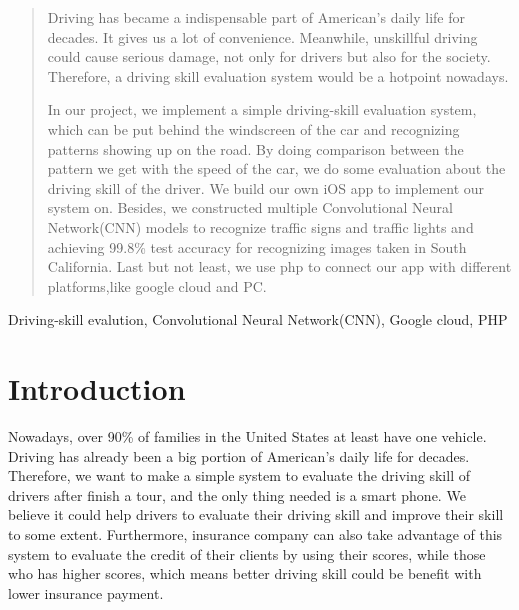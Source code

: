 \documentclass[conference]{IEEEtran}
\begin{document}
\begin{abstract}
Driving has became a indispensable part of American's daily life for decades. It gives us a lot of convenience. Meanwhile, unskillful driving could cause serious damage, not only for drivers but also for the society. Therefore, a driving skill evaluation system would be a hotpoint nowadays. 

In our project, we implement a simple driving-skill evaluation system, which can be put behind the windscreen of the car and recognizing patterns showing up on the road. By doing comparison between the pattern we get with the speed of the car, we do some evaluation about the driving skill of the driver. We build our own  iOS app to implement our system on. Besides, we constructed multiple Convolutional Neural Network(CNN) models to recognize traffic signs and traffic lights and achieving 99.8\% test accuracy for recognizing images taken in South California. Last but not least, we use php to connect our app with different platforms,like google cloud and PC.
\end{abstract}

\begin{IEEEkeywords}
Driving-skill evalution, Convolutional Neural Network(CNN),  Google cloud, PHP
\end{IEEEkeywords}

\section{Introduction}
Nowadays, over 90\% of families in the United States at least have one vehicle. Driving has already been a big portion of American's daily life for decades. Therefore, we want to make a simple system to evaluate the driving skill of drivers after finish a tour, and the only thing needed is a smart phone. We believe it could help drivers to evaluate their driving skill and improve their skill to some extent. Furthermore, insurance company can also take advantage of this system to evaluate the credit of their clients by using their scores, while those who has higher scores, which means better driving skill could be benefit with lower insurance payment.
\end{document}
